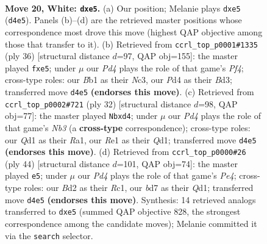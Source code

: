\documentclass[11pt]{article}
\begin{document}
\begin{figure}[p]
\label{fig:thought-m36}
\end{figure}

\clearpage

\begin{figure}[p]\centering
\begin{subfigure}{0.46\textwidth}\centering
\resizebox{\linewidth}{!}{%
\newchessgame
\chessboard[
  setfen={rn1qr1k1/pp1bbppp/5n2/2Ppp3/3P3N/P1N4P/1P1B1PP1/1BRQR1K1 w - - 0 20},
  showmover=false,
  pgfstyle=straightmove, color=movearrow, markmove={d4-e5}
]}
\caption{}
\end{subfigure}\hfill
\begin{subfigure}{0.46\textwidth}\centering
\resizebox{\linewidth}{!}{%
\newchessgame
\chessboard[
  setfen={r1qbr1k1/1ppb1pp1/p4nnp/P3p3/1P3P2/R1NB1N1P/2P3P1/2BQR1K1 w - - 0 19},
  showmover=false,
  pgfstyle=straightmove, color=movearrow, markmove={f4-e5}
]}
\caption{}
\end{subfigure}
\\[4pt]
\begin{subfigure}{0.46\textwidth}\centering
\resizebox{\linewidth}{!}{%
\newchessgame
\chessboard[
  setfen={3q1rk1/1b1nbppp/1rn1p3/pp2P3/3p1B2/PN3N1P/1PB2PP1/R2QR1K1 w - - 4 17},
  showmover=false,
  pgfstyle=straightmove, color=movearrow, markmove={b3-d4}
]}
\caption{}
\end{subfigure}\hfill
\begin{subfigure}{0.46\textwidth}\centering
\resizebox{\linewidth}{!}{%
\newchessgame
\chessboard[
  setfen={r3r1k1/1q2npb1/2b1p1pp/p2p4/1n1PPP1B/2N4P/1P1N2P1/2RQRB1K w - - 0 23},
  showmover=false,
  pgfstyle=straightmove, color=movearrow, markmove={e4-e5}
]}
\caption{}
\end{subfigure}
\caption{\textbf{Move 20, White: \texttt{dxe5}.} (a) Our position; Melanie plays \texttt{dxe5} (\texttt{d4e5}). Panels (b)--(d) are the retrieved master positions whose correspondence most drove this move (highest QAP objective among those that transfer to it). (b) Retrieved from \texttt{ccrl\_top\_p0001\#1335} (ply 36) [structural distance $d$=97, QAP obj=155]: the master played \texttt{fxe5}; under $\mu$ our \emph{Pd4} plays the role of that game's \emph{Pf4}; cross-type roles: our \emph{B}b1 as their \emph{N}c3, our \emph{P}d4 as their \emph{B}d3; transferred move \texttt{d4e5} \textbf{(endorses this move)}. (c) Retrieved from \texttt{ccrl\_top\_p0002\#721} (ply 32) [structural distance $d$=98, QAP obj=77]: the master played \texttt{Nbxd4}; under $\mu$ our \emph{Pd4} plays the role of that game's \emph{Nb3} (a \textbf{cross-type} correspondence); cross-type roles: our \emph{Q}d1 as their \emph{R}a1, our \emph{R}e1 as their \emph{Q}d1; transferred move \texttt{d4e5} \textbf{(endorses this move)}. (d) Retrieved from \texttt{ccrl\_top\_p0000\#26} (ply 44) [structural distance $d$=101, QAP obj=74]: the master played \texttt{e5}; under $\mu$ our \emph{Pd4} plays the role of that game's \emph{Pe4}; cross-type roles: our \emph{B}d2 as their \emph{R}c1, our \emph{b}d7 as their \emph{Q}d1; transferred move \texttt{d4e5} \textbf{(endorses this move)}. Synthesis: 14 retrieved analogs transferred to \texttt{dxe5} (summed QAP objective 828, the strongest correspondence among the candidate moves); Melanie committed it via the \texttt{search} selector.}

\end{figure}
\end{document}
